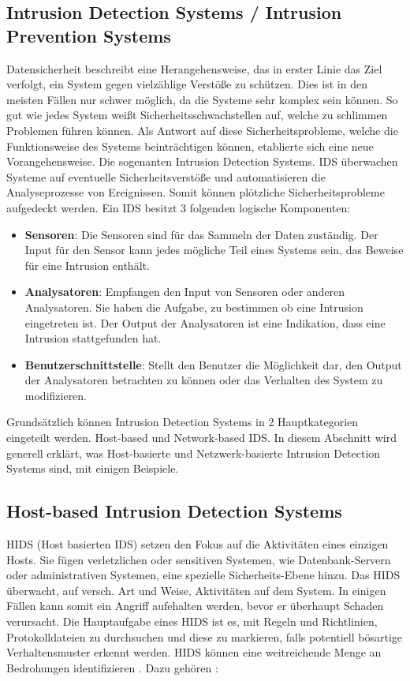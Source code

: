 \subsection{Intrusion Detection Systems / Intrusion Prevention Systems}
Datensicherheit beschreibt eine Herangehensweise, das in erster Linie das Ziel verfolgt, ein System gegen vielzählige Verstöße zu schützen. Dies ist in den meisten Fällen nur schwer möglich, da die Systeme sehr komplex sein können. So gut wie jedes System weißt Sicherheitsschwachstellen auf, welche zu schlimmen Problemen führen können.
Als Antwort auf diese Sicherheitsprobleme, welche die Funktionsweise des Systems beinträchtigen können, etablierte sich eine neue Vorangehensweise. Die sogenanten Intrusion Detection Systems.
IDS überwachen Systeme auf eventuelle Sicherheitsverstöße und automatisieren die Analyseprozesse von Ereignissen. Somit können plötzliche Sicherheitsprobleme aufgedeckt werden.\cite{haystack_ids}
Ein IDS besitzt 3 folgenden logische Komponenten: \cite{IDS_Book_2}

\begin{itemize}
    \item \textbf{Sensoren}: Die Sensoren sind für das Sammeln der Daten zuständig. Der Input für den Sensor kann jedes mögliche Teil eines Systems sein, das Beweise für eine Intrusion enthält.\cite{IDS_Book_2}\bigbreak
    \item \textbf{Analysatoren}: Empfangen den Input von Sensoren oder anderen Analysatoren. Sie haben die Aufgabe, zu bestimmen ob eine Intrusion eingetreten ist. Der Output der Analysatoren ist eine Indikation, dass eine Intrusion stattgefunden hat.\cite{IDS_Book_2}\bigbreak
    \item \textbf{Benutzerschnittstelle}: Stellt den Benutzer die Möglichkeit dar, den Output der Analysatoren betrachten zu können oder das Verhalten des System zu modifizieren.\cite{IDS_Book_2}\bigbreak
\end{itemize}

Grundsätzlich können Intrusion Detection Systems in 2 Hauptkategorien eingeteilt werden. Host-based und Network-based IDS.\cite{IDS_Book_1}
In diesem Abschnitt wird generell erklärt, was Host-basierte und Netzwerk-basierte Intrusion Detection Systems sind, mit einigen Beispiele.

\subsection{Host-based Intrusion Detection Systems}
HIDS (Host basierten IDS) setzen den Fokus auf die Aktivitäten eines einzigen Hosts. Sie fügen verletzlichen oder sensitiven Systemen, wie Datenbank-Servern oder administrativen Systemen, eine spezielle Sicherheits-Ebene hinzu. Das HIDS überwacht, auf versch. Art und Weise, Aktivitäten auf dem System. In einigen Fällen kann somit ein Angriff aufehalten werden, bevor er überhaupt Schaden verursacht. \cite{IDS_Book_1} \cite{IDS_Book_2}
Die Hauptaufgabe eines HIDS ist es, mit Regeln und Richtlinien, Protokolldateien zu durchsuchen und diese zu markieren, falls potentiell bösartige Verhaltensmuster erkennt werden.
\clearpage
HIDS können eine weitreichende Menge an Bedrohungen identifizieren \cite{hids_url_2}. Dazu gehören :

